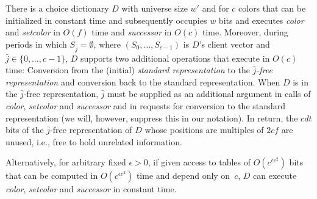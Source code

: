 \documentclass[envcountsame,envcountsect,undated,nolinenumbers]{lnthi}
\def\Tvn#1{\hbox{\textit{#1\/}}}
\def\jj{{\bar j}}
\begin{document}
\begin{lemma}
\label{lem:j-free}There is a choice dictionary $D$
with universe size $w'$ and for $c$ colors
that can be initialized in constant
time and subsequently occupies $w$ bits and
executes \Tvn{color} and \Tvn{setcolor}
in $O(f)$ time and
\Tvn{successor} in $O(c)$ time.
Moreover, during periods in which
$S_\jj=\emptyset$, where
$(S_0,\ldots,S_{c-1})$ is $D$'s client vector and
$\jj\in\{0,\ldots,c-1\}$,
$D$ supports two additional operations
that execute in $O(c)$ time:
Conversion from
the (initial) \emph{standard representation}
to the \emph{$\jj$-free representation}
and conversion back to
the standard representation.
When $D$ is in the $\jj$-free representation, $\jj$
must be supplied as an additional argument in
calls of \Tvn{color}, \Tvn{setcolor} and \Tvn{successor}
and in requests for conversion to the standard representation
(we will, however, suppress this in our notation).
In return, the $c d t$ bits
of the $\jj$-free representation of $D$
whose positions are multiples of $2 c f$ are unused,
i.e., free to hold unrelated information.

Alternatively, for arbitrary fixed $\epsilon>0$,
if given access to tables of
$O(c^{\epsilon c^2})$ bits that can be computed in
$O(c^{\epsilon c^2})$ time and depend
only on~$c$, $D$ can execute
\Tvn{color}, \Tvn{setcolor} and \Tvn{successor}
in constant time.
\end{lemma}
\end{document}

